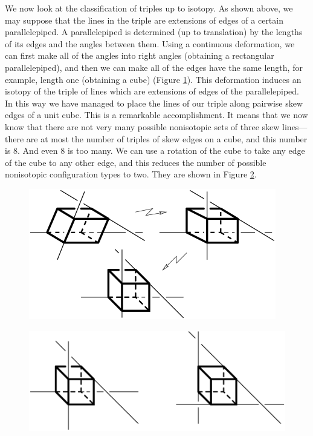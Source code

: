 \documentclass{article}
\begin{document}
We now look at the classification of triples up to isotopy. As shown above, we
may suppose that the lines in the triple are extensions of edges of a certain
parallelepiped. A parallelepiped is determined (up to translation) by the
lengths of its edges and the angles between them. Using a continuous
deformation, we can first make all of the angles into right angles (obtaining a
rectangular parallelepiped), and then we can make all of the edges have the
same length, for example, length one (obtaining a cube) (Figure 
\ref{f14}). This
deformation induces an isotopy of the triple of lines which are extensions of
edges of the parallelepiped. In this way we have managed to place the lines of
our triple along pairwise skew edges of a unit cube. This is a remarkable
accomplishment. It means that we now know that there are not very many possible
nonisotopic sets of three skew lines---there are at most the number of triples
of skew edges on a cube, and this number is 8. And even 8 is too many. We can
use a rotation of the cube to take any edge of the cube to any other edge, and
this reduces the number of possible nonisotopic configuration types to two. They
are shown in Figure \ref{f15}.

\begin{figure}
{\includegraphics{imagesSkewlines/x14.png}}
\caption{}
\label{f14}
\end{figure}

\begin{figure}
{\includegraphics{imagesSkewlines/x15.png}}
\caption{}
\label{f15}
\end{figure}
\end{document}
